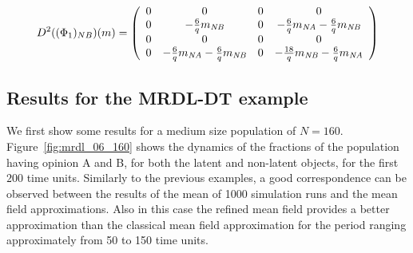 \documentclass{amsart}
\begin{document}
  $$D^2((\Phi_1)_{NB})(m)
= \left(
    \begin{array}{cccc}
      0 &  0& 0 & 0  \\
      0 & -\frac{6}{q}m_{\mathit{NB}} & 0 & -\frac{6}{q}m_{\mathit{NA}}-\frac{6}{q}m_{\mathit{NB}} \\
      0 & 0 & 0 & 0 \\
      0 & -\frac{6}{q}m_{\mathit{NA}}-\frac{6}{q}m_{\mathit{NB}} & 0 & -\frac{18}{q}m_{\mathit{NB}}-\frac{6}{q}m_{\mathit{NA}} \\
    \end{array}
  \right)$$
  
\subsection{Results for the MRDL-DT example}


We first show some results for a medium size population of $N=160$. Figure~\ref{fig:mrdl_06_160} shows the dynamics of the fractions of the population having opinion A and B, for both the latent and non-latent objects,
for the first $200$ time units. Similarly to the previous examples, a good correspondence can be observed between the results of the mean of 1000 simulation runs and the mean field approximations. Also in this case the refined mean field provides a better approximation than the classical mean field approximation for the period ranging approximately from 50 to 150 time units. 
\end{document}
